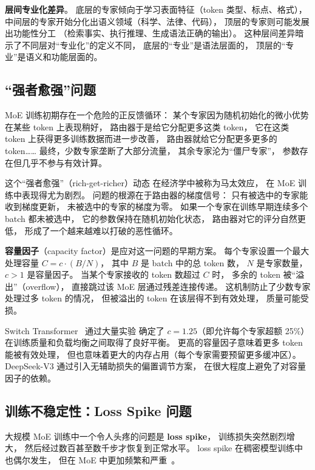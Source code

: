 \textbf{层间专业化差异}。
底层的专家倾向于学习表面特征（token 类型、标点、格式），
中间层的专家开始分化出语义领域（科学、法律、代码），
顶层的专家则可能发展出功能性分工
（检索事实、执行推理、生成语法正确的输出）。
这种层间差异暗示了不同层对“专业化”的定义不同，
底层的“专业”是语法层面的，
顶层的“专业”是语义和功能层面的。

\subsection{“强者愈强”问题}

MoE 训练初期存在一个危险的正反馈循环：
某个专家因为随机初始化的微小优势
在某些 token 上表现稍好，
路由器于是给它分配更多这类 token，
它在这类 token 上获得更多训练数据而进一步改善，
路由器就给它分配更多更多的 token……
最终，少数专家垄断了大部分流量，
其余专家沦为“僵尸专家”，
参数存在但几乎不参与有效计算。

这个“强者愈强”（rich-get-richer）动态
在经济学中被称为马太效应，
在 MoE 训练中表现得尤为剧烈。
问题的根源在于路由器的梯度信号：
只有被选中的专家能收到梯度更新，
未被选中的专家的梯度为零。
如果一个专家在训练早期连续多个 batch 都未被选中，
它的参数保持在随机初始化状态，
路由器对它的评分自然更低，
形成了一个越来越难以打破的恶性循环。

\textbf{容量因子}（capacity factor）是应对这一问题的早期方案。
每个专家设置一个最大处理容量 $C = c \cdot (B / N)$，
其中 $B$ 是 batch 中的总 token 数，
$N$ 是专家数量，$c > 1$ 是容量因子。
当某个专家接收的 token 数超过 $C$ 时，
多余的 token 被“溢出”（overflow），
直接跳过该 MoE 层通过残差连接传递。
这机制防止了少数专家处理过多 token 的情况，
但被溢出的 token 在该层得不到有效处理，
质量可能受损。

Switch Transformer~\cite{fedus2022switch} 通过大量实验
确定了 $c = 1.25$（即允许每个专家超额 25\%）
在训练质量和负载均衡之间取得了良好平衡。
更高的容量因子意味着更多 token 能被有效处理，
但也意味着更大的内存占用（每个专家需要预留更多缓冲区）。
DeepSeek-V3 通过引入无辅助损失的偏置调节方案，
在很大程度上避免了对容量因子的依赖。

\subsection{训练不稳定性：Loss Spike 问题}

大规模 MoE 训练中一个令人头疼的问题是
\textbf{loss spike}，
训练损失突然剧烈增大，
然后经过数百甚至数千步才恢复到正常水平。
loss spike 在稠密模型训练中也偶尔发生，
但在 MoE 中更加频繁和严重~\cite{shazeer2017moe}。

